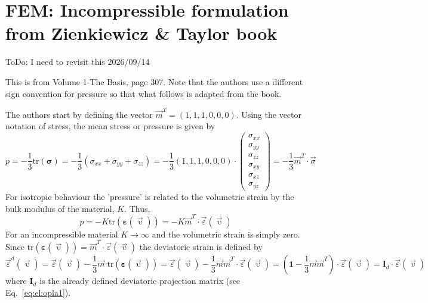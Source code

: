 \newpage
\section{FEM: Incompressible formulation from Zienkiewicz \& Taylor book}

{\color{red} ToDo: I need to revisit this 2026/09/14}

This is from Volume 1-The Basis, page 307. Note that the authors use a different sign convention for pressure so that what follows is adapted from the book.

The authors start by defining the vector $\vec{m}^T=(1,1,1,0,0,0)$.
Using the vector notation of stress, the mean stress or pressure is given by
\[
p 
= -\frac13 \textrm{tr}({\bm \sigma}) 
= -\frac13 (\sigma_{xx}+\sigma_{yy}+\sigma_{zz})
= -\frac13
\left(1,1,1,0,0,0\right)
\cdot
\left(
\begin{array}{c}
\sigma_{xx}\\
\sigma_{yy}\\
\sigma_{zz}\\
\sigma_{xy}\\
\sigma_{xz}\\
\sigma_{yz}
\end{array}
\right)
= -\frac13 \vec{m}^T\cdot \vec{\sigma}
\]
For isotropic behaviour the 'pressure' is related to the volumetric strain by the bulk modulus of the material, $K$. Thus,
\[
p
=-K \textrm{tr}(\bm\varepsilon(\vec\upupsilon)) 
= -K \vec{m}^T\cdot \vec{\varepsilon}(\vec\upupsilon)
\]
For an incompressible material $K\rightarrow \infty$ and the volumetric strain is simply zero. Since $\textrm{tr}(\bm\varepsilon(\vec\upupsilon))=\vec{m}^T\cdot \vec{\varepsilon}(\vec\upupsilon)$ the deviatoric strain is defined by
\[
\vec\varepsilon^d (\vec\upupsilon)
= \vec\varepsilon(\vec\upupsilon)-\frac13 \vec{m}\; \textrm{tr}(\bm\varepsilon(\vec\upupsilon))
= \vec\varepsilon(\vec\upupsilon)-\frac13 \vec{m} \vec{m}^T\cdot \vec{\varepsilon}(\vec\upupsilon)
= \left( {\bm 1} -\frac13 \vec{m} \vec{m}^T \right) \cdot \vec{\varepsilon}(\vec\upupsilon)
= {\bm I}_d \cdot \vec{\varepsilon}(\vec\upupsilon)
\]
where ${\bm I}_d$ is the already defined deviatoric projection matrix
(see Eq.~\eqref{eq:el:opla1}).

